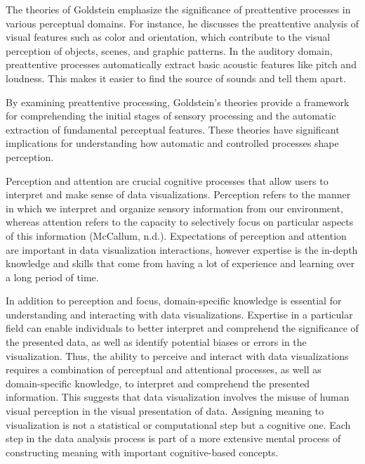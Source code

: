 \documentclass[print]{nuthesis}
\begin{document}
The theories of Goldstein emphasize the significance of preattentive processes in various perceptual domains.
For instance, he discusses the preattentive analysis of visual features such as color and orientation, which contribute to the visual perception of objects, scenes, and graphic patterns.
In the auditory domain, preattentive processes automatically extract basic acoustic features like pitch and loudness.
This makes it easier to find the source of sounds and tell them apart.

By examining preattentive processing, Goldstein's theories provide a framework for comprehending the initial stages of sensory processing and the automatic extraction of fundamental perceptual features.
These theories have significant implications for understanding how automatic and controlled processes shape perception.~

Perception and attention are crucial cognitive processes that allow users to interpret and make sense of data visualizations.
Perception refers to the manner in which we interpret and organize sensory information from our environment, whereas attention refers to the capacity to selectively focus on particular aspects of this information (McCallum, n.d.).
Expectations of perception and attention are important in data visualization interactions, however expertise is the in-depth knowledge and skills that come from having a lot of experience and learning over a long period of time.

In addition to perception and focus, domain-specific knowledge is essential for understanding and interacting with data visualizations.
Expertise in a particular field can enable individuals to better interpret and comprehend the significance of the presented data, as well as identify potential biases or errors in the visualization.
Thus, the ability to perceive and interact with data visualizations requires a combination of perceptual and attentional processes, as well as domain-specific knowledge, to interpret and comprehend the presented information.
This suggests that data visualization involves the misuse of human visual perception in the visual presentation of data.
Assigning meaning to visualization is not a statistical or computational step but a cognitive one.
Each step in the data analysis process is part of a more extensive mental process of constructing meaning with important cognitive-based concepts.
\end{document}
